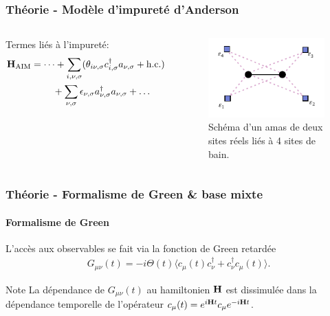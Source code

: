 \begin{frame}
    \frametitle{Théorie - Modèle d'impureté d'Anderson}
    \begin{columns}
        Termes liés à l'impureté:
        {\scriptsize
        \begin{align*}
            \vb{H}_{\text{AIM}} &= \dots + \sum_{i,\nu,\sigma}(\theta_{i\nu,\sigma}c_{i,\sigma}^\dagger a_{\nu,\sigma} + \text{h.c.}) \\
                                &\hspace{0.8cm}+\sum_{\nu,\sigma}\epsilon_{\nu,\sigma}a^\dagger_{\nu,\sigma}a_{\nu,\sigma}+ \dots
        \end{align*}
        }
        \begin{figure}
           \centering
            \includegraphics[scale=1.15]{./figures/results/clusters/1D_2s_4b_cluster.pdf}
            \caption{Schéma d'un amas de deux sites réels liés à 4 sites de bain.}
            \label{fig: 1D_2s_4b_HAIM}
        \end{figure}
    \end{columns}
\end{frame}

\begin{frame}
    \frametitle{Théorie - Formalisme de Green \& base mixte}
    \framesubtitle{Formalisme de Green}
    L'accès aux observables se fait via la fonction de Green retardée
    \begin{align}
        G_{\mu\nu}(t) = -i\Theta(t)\langle c_\mu(t)c_\nu^\dagger + c_\nu^\dagger c_\mu(t)\rangle.
        \label{eq: green_retarded}
    \end{align}
    \vspace{1cm}
    \pause
    \begin{noteblock}{Note}
      La dépendance de $G_{\mu\nu}(t)$ au hamiltonien $\vb{H}$ est dissimulée dans la dépendance
         temporelle de l'opérateur $c_\mu(t) = e^{i\vb{H}t}c_\mu e^{-i\vb{H}t}$.
    \end{noteblock}
\end{frame}

